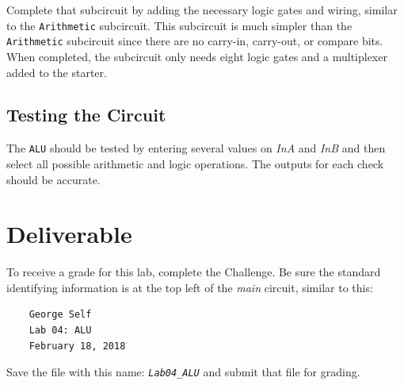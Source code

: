 Complete that subcircuit by adding the necessary logic gates and wiring, similar to the \lstinline[columns=fixed]|Arithmetic| subcircuit. This subcircuit is much simpler than the \lstinline[columns=fixed]|Arithmetic| subcircuit since there are no carry-in, carry-out, or compare bits. When completed, the subcircuit only needs eight logic gates and a multiplexer added to the starter.

\subsection{Testing the Circuit}

The \lstinline[columns=fixed]|ALU| should be tested by entering several values on \textit{InA} and \textit{InB} and then select all possible arithmetic and logic operations. The outputs for each check should be accurate.

\section{Deliverable}

To receive a grade for this lab, complete the Challenge. Be sure the standard identifying information is at the top left of the \textit{main} circuit, similar to this: 

\bigskip
\begin{minipage}{\linewidth}
	\begin{verbatim}
	George Self
	Lab 04: ALU
	February 18, 2018
	\end{verbatim}
\end{minipage}
\bigskip

Save the file with this name: \emph{\texttt{Lab04\_ALU}} and submit that file for grading.

